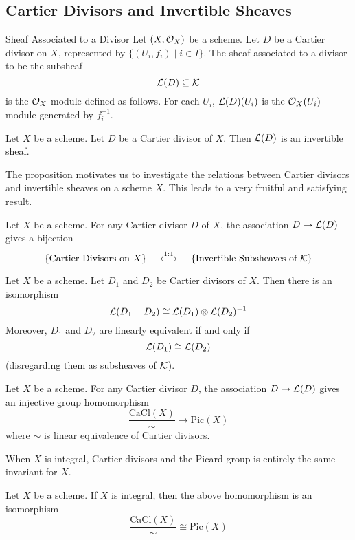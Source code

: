 \documentclass[a4paper]{article}
\begin{document}
\subsection{Cartier Divisors and Invertible Sheaves}
\begin{defn}{Sheaf Associated to a Divisor}{} Let $(X,\mathcal{O}_X)$ be a scheme. Let $D$ be a Cartier divisor on $X$, represented by $\{(U_i,f_i)\;|\;i\in I\}$. The sheaf associated to a divisor to be the subsheaf $$\mathcal{L}(D)\subseteq\mathcal{K}$$ is the $\mathcal{O}_X$-module defined as follows. For each $U_i$, $\mathcal{L}(D)(U_i)$ is the $\mathcal{O}_X(U_i)$-module generated by $f_i^{-1}$. 
\end{defn}

\begin{prp}{}{} Let $X$ be a scheme. Let $D$ be a Cartier divisor of $X$. Then $\mathcal{L}(D)$ is an invertible sheaf. 
\end{prp}

The proposition motivates us to investigate the relations between Cartier divisors and invertible sheaves on a scheme $X$. This leads to a very fruitful and satisfying result. 

\begin{thm}{}{} Let $X$ be a scheme. For any Cartier divisor $D$ of $X$, the association $D\mapsto\mathcal{L}(D)$ gives a bijection $$\{\text{Cartier Divisors on }X\}\;\;\;\;\overset{1:1}{\longleftrightarrow}\;\;\;\;\{\text{Invertible Subsheaves of }\mathcal{K}\}$$
\end{thm}

\begin{prp}{}{} Let $X$ be a scheme. Let $D_1$ and $D_2$ be Cartier divisors of $X$. Then there is an isomorphism $$\mathcal{L}(D_1-D_2)\cong\mathcal{L}(D_1)\otimes\mathcal{L}(D_2)^{-1}$$ Moreover, $D_1$ and $D_2$ are linearly equivalent if and only if $$\mathcal{L}(D_1)\cong\mathcal{L}(D_2)$$ (disregarding them as subsheaves of $\mathcal{K}$). 
\end{prp}

\begin{prp}{}{} Let $X$ be a scheme. For any Cartier divisor $D$, the association $D\mapsto\mathcal{L}(D)$ gives an injective group homomorphism $$\frac{\text{CaCl}(X)}{\sim}\to\text{Pic}(X)$$ where $\sim$ is linear equivalence of Cartier divisors. 
\end{prp}

When $X$ is integral, Cartier divisors and the Picard group is entirely the same invariant for $X$. 

\begin{thm}{}{} Let $X$ be a scheme. If $X$ is integral, then the above homomorphism is an isomorphism $$\frac{\text{CaCl}(X)}{\sim}\cong\text{Pic}(X)$$
\end{thm}
\end{document}
